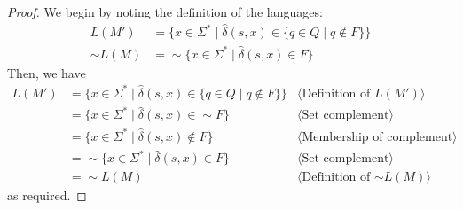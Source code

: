 \documentclass[11pt,fleqn]{article}
\newcommand{\set}[1]{{\{ #1 \}}}
\newcommand{\pnote}[1]{\langle \mbox{#1} \rangle}
\begin{document}
    \begin{proof}
    We begin by noting the definition of the languages:
    \begin{align*}
    L(M') &= \set{x \in \Sigma^* \mid \hat\delta(s,x) \in \set{q\in Q\mid q \not \in F}}\\
    {\sim}L(M) &= {\sim}\set{x \in \Sigma^* \mid \hat\delta(s,x) \in F}
    \end{align*}
    Then, we have
    \begin{align*}
    L(M') &= \set{x \in \Sigma^* \mid \hat\delta(s,x) \in \set{q\in Q\mid q \not \in F}} & \pnote{Definition of $L(M')$}\\
    &= \set{x \in \Sigma^* \mid \hat\delta(s,x) \in {\sim}F} & \pnote{Set complement}\\
    &= \set{x \in \Sigma^* \mid \hat\delta(s,x) \not \in F} & \pnote{Membership of complement}\\
    &= {\sim}\set{x \in \Sigma^* \mid \hat\delta(s,x) \in F} & \pnote{Set complement}\\
    &= {\sim}L(M) & \pnote{Definition of ${\sim}L(M)$}
    \end{align*}
    as required.
    \end{proof}
\end{document}
